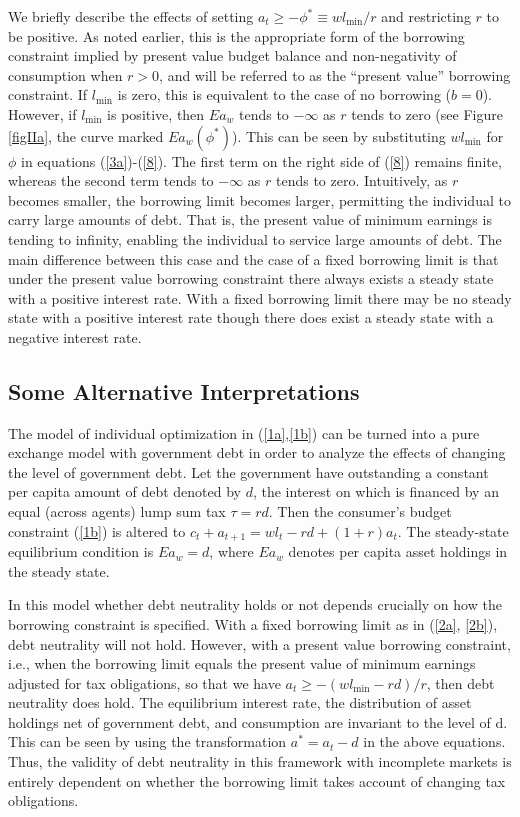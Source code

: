 \documentclass[12pt]{article}
\theoremstyle{definition}
\begin{document}
We briefly describe the effects of setting $a_t \geq -\phi^* \equiv w l_{\min}/r$ and restricting $r$ to be positive. As noted earlier, this is the appropriate form of the borrowing constraint implied by present value budget balance and non-negativity of consumption when $r>0$, and will be referred to as the ``present value'' borrowing constraint. If $l_{\min}$ is zero, this is equivalent to the case of no borrowing ($b=0$). However, if $l_{\min}$ is positive, then $Ea_w$ tends to $-\infty$ as $r$ tends to zero (see Figure \ref{figIIa}, the curve marked $Ea_w(\phi^*)$). This can be seen by substituting $wl_{\min}$ for $\phi$ in equations (\ref{3a})-(\ref{8}). The first term on the right side of (\ref{8}) remains finite, whereas the second term tends to $-\infty$ as $r$ tends to zero. Intuitively, as $r$ becomes smaller, the borrowing limit becomes larger, permitting the individual to carry large amounts of debt. That is, the present value of minimum earnings is tending to infinity, enabling the individual to service large amounts of debt. The main difference between this case and the case of a fixed borrowing limit is that under the present value borrowing constraint there always exists a steady state with a positive interest rate. With a fixed borrowing limit there may be no steady state with a positive interest rate though there does exist a steady state with a negative interest rate.

\subsection{Some Alternative Interpretations}

The model of individual optimization in (\ref{1a},\ref{1b}) can be turned into a pure exchange model with government debt in order to analyze the effects of changing the level of government debt. Let the government have outstanding a constant per capita amount of debt denoted by $d$, the interest on which is financed by an equal (across agents) lump sum tax $\tau = rd$. Then the consumer's budget constraint (\ref{1b}) is altered to $c_t + a_{t+1} = wl_t - rd + (1+r)a_t$. The steady-state equilibrium condition is $Ea_w = d$, where $Ea_w$ denotes per capita asset holdings in the steady state.

In this model whether debt neutrality holds or not depends crucially on how the borrowing constraint is specified. With a fixed borrowing limit as in (\ref{2a}, \ref{2b}), debt neutrality will not hold. However, with a present value borrowing constraint, i.e., when the borrowing limit equals the present value of minimum earnings adjusted for tax obligations, so that we have $a_t \geq -(wl_{\min}-rd)/r$, then debt neutrality does hold. The equilibrium interest rate, the distribution of asset holdings net of government debt, and consumption are invariant to the level of d. This can be seen by using the transformation $a^{*} = a_t - d$ in the above equations. Thus, the validity of debt neutrality in this framework with incomplete markets is entirely dependent on whether the borrowing limit takes account of changing tax obligations.
\end{document}
